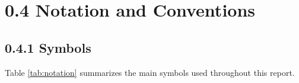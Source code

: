 \documentclass[12pt,a4paper]{report}
\newcommand{\Will}{W}
\begin{document}
\begin{abstract}
Throughout, ONTO$\Sigma$ remains an open, layered framework. It does not seek to replace domain-specific theories, but to provide a unified ontological, dynamical, and geometric vocabulary for directedness, coherence, and drift. The central empirical question it poses is whether will (\Will), understood as an ontological operator of directedness, yields deeper insight into adaptive phenomena than can be obtained through purely mechanistic or purely goal-centric models. The report concludes with executable toy models and proposals for cross-disciplinary experiments designed to test and refine this claim.
\end{abstract}

\clearpage

\tableofcontents
\clearpage

\section*{0.4 Notation and Conventions}

\subsection*{0.4.1 Symbols}

Table \ref{tab:notation} summarizes the main symbols used throughout this report.
\end{document}
